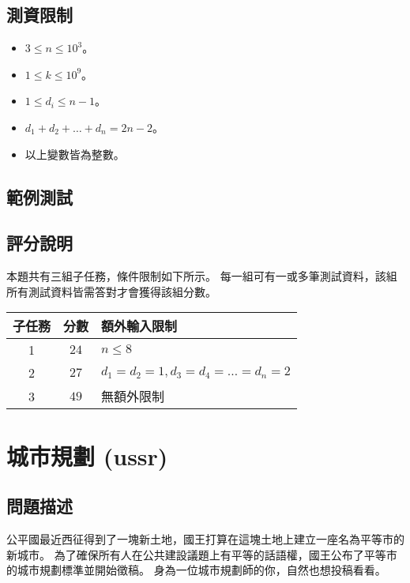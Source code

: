 \subsection{測資限制}

\begin{itemize}
\tightlist
\item
  \(3 \le n \le 10^3\)。
\item
  \(1 \le k \le 10^9\)。
\item
  \(1 \le d_i \le n-1\)。
\item
  \(d_1 + d_2 + \ldots + d_n = 2n-2\)。
\item
  以上變數皆為整數。
\end{itemize}

\subsection{範例測試}

\begin{example}
%
%
\end{example}

\subsection{評分說明}

本題共有三組子任務，條件限制如下所示。
每一組可有一或多筆測試資料，該組所有測試資料皆需答對才會獲得該組分數。

\begin{longtable}[]{@{}ccl@{}}
\toprule
子任務 & 分數 & 額外輸入限制 \\
\midrule
\endhead
1 & \(24\) & \(n \le 8\) \\
2 & \(27\) & \(d_1 = d_2 = 1, d_3 = d_4 = \ldots = d_n = 2\) \\
3 & \(49\) & 無額外限制 \\
\bottomrule
\end{longtable}

\section{城市規劃 (ussr)}

\subsection{問題描述}

公平國最近西征得到了一塊新土地，國王打算在這塊土地上建立一座名為平等市的新城市。
為了確保所有人在公共建設議題上有平等的話語權，國王公布了平等市的城市規劃標準並開始徵稿。
身為一位城市規劃師的你，自然也想投稿看看。

